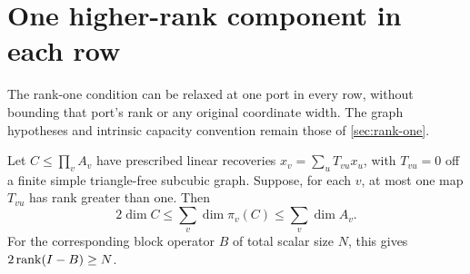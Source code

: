 \section{One higher-rank component in each row}\label{sec:higher-rank}
The rank-one condition can be relaxed at one port in every row, without
bounding that port's rank or any original coordinate width. The graph
hypotheses and intrinsic capacity convention remain those of
\cref{sec:rank-one}.

\begin{theorem}\label{thm:one-high}
Let $C\leq\prod_v A_v$ have prescribed linear recoveries
$x_v=\sum_u T_{vu}x_u$, with $T_{vu}=0$ off a finite simple triangle-free
subcubic graph. Suppose, for each $v$, at most one map $T_{vu}$ has rank
greater than one. Then
\[
 2\dim C\leq\sum_v\dim\pi_v(C)\leq\sum_v\dim A_v.
\]
For the corresponding block operator $B$ of total scalar size $N$, this
gives $2\operatorname{rank}(I-B)\geq N$.
\end{theorem}
